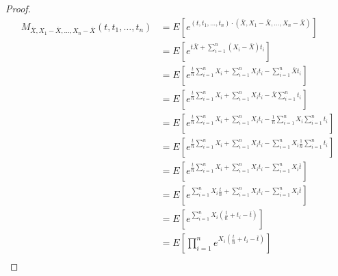 \begin{prop}
\begin{proof}
        \begin{align*}
            M_{\overline{X},X_1 - \overline{X}, \ldots, X_n - \overline{X}}(t, t_1, \ldots, t_n) &= E[e^{(t, t_1, \ldots, t_n) \cdot (\overline{X},X_1 - \overline{X}, \ldots, X_n - \overline{X})}] \\
                                                                                                 &= E\left[e^{t\overline{X} + \sum\limits_{i=1}^{n}(X_i - \overline{X})t_i}\right] \\
                                                                                                 &= E\left[e^{\frac{t}{n}\sum\limits_{i=1}^n X_i + \sum\limits_{i=1}^n X_it_i - \sum\limits_{i=1}^n \overline{X}t_i}\right] \\
                                                                                                 &= E\left[e^{\frac{t}{n}\sum\limits_{i=1}^n X_i + \sum\limits_{i=1}^n X_it_i - \overline{X}\sum\limits_{i=1}^n t_i}\right] \\
                                                                                                 &= E\left[e^{\frac{t}{n}\sum\limits_{i=1}^n X_i + \sum\limits_{i=1}^n X_it_i - \frac{1}{n}\sum\limits_{i=1}^n X_i\sum\limits_{i=1}^n t_i}\right] \\
                                                                                                 &= E\left[e^{\frac{t}{n}\sum\limits_{i=1}^n X_i + \sum\limits_{i=1}^n X_it_i - \sum\limits_{i=1}^n X_i\frac{1}{n}\sum\limits_{i=1}^n t_i}\right] \\
                                                                                                 &= E\left[e^{\frac{t}{n}\sum\limits_{i=1}^n X_i + \sum\limits_{i=1}^n X_it_i - \sum\limits_{i=1}^n X_i\overline{t}}\right] \\
                                                                                                 &= E\left[e^{\sum\limits_{i=1}^n X_i\frac{t}{n} + \sum\limits_{i=1}^n X_it_i - \sum\limits_{i=1}^n X_i\overline{t}}\right] \\
                                                                                                 &= E\left[e^{\sum\limits_{i=1}^n X_i \left(\frac{t}{n} + t_i - \overline{t}\right)}\right] \\
                                                                                                 &= E\left[\prod_{i=1}^{n}e^{X_i\left(\frac{t}{n}+t_i - \overline{t}\right)}\right] \\

\end{align*}
\end{proof}
\end{prop}

